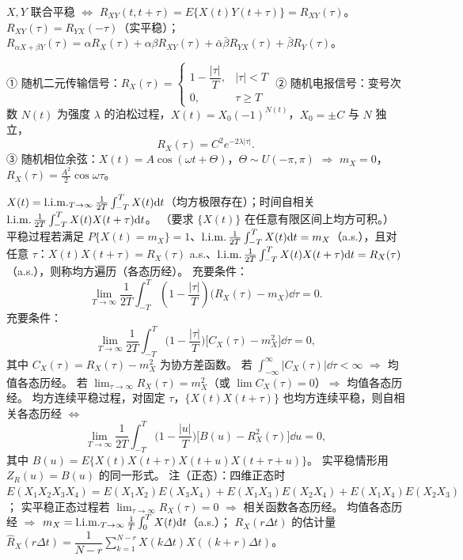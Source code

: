 \documentclass[UTF8,12pt,a4paper]{ctexart}
\begin{document}
 $X,Y$ 联合平稳 $\iff$ $R_{XY}(t,t+\tau)=E\{X(t)Y(t+\tau)\}=R_{XY}(\tau)$。
 $R_{XY}(\tau)=R_{YX}(-\tau)$（实平稳）；$R_{\alpha X+\beta Y}(\tau)=\alpha R_X(\tau)+\alpha\beta R_{XY}(\tau)+\bar\alpha\bar\beta R_{YX}(\tau)+\bar\beta R_Y(\tau)$。

① 随机二元传输信号：$R_X(\tau)=\begin{cases}1-\dfrac{|\tau|}{T},&|\tau|<T\\[2pt]0,&\tau\ge T\end{cases}$
② 随机电报信号：变号次数 $N(t)$ 为强度 $\lambda$ 的泊松过程，$X(t)=X_0(-1)^{N(t)}$，$X_0=\pm C$ 与 $N$ 独立，
$$R_X(\tau)=C^2e^{-2\lambda|\tau|}.$$
③ 随机相位余弦：$X(t)=A\cos(\omega t+\Theta)$，$\Theta\sim U(-\pi,\pi)$ $\Rightarrow$ $m_X=0$，$R_X(\tau)=\tfrac{A^2}{2}\cos\omega\tau$。

 $X(t)=\mathop{\mathrm{l.i.m.}}_{T\to\infty}\frac1{2T}\int_{-T}^{T}X(t)\mathrm{d} t$（均方极限存在）；时间自相关 $\mathop{\mathrm{l.i.m.}}\frac1{2T}\int_{-T}^{T}X(t)X(t+\tau)\mathrm{d} t$。
（要求 $\{X(t)\}$ 在任意有限区间上均方可积。）
 平稳过程若满足 $P\{X(t)=m_X\}=1$、$\mathop{\mathrm{l.i.m.}}\frac1{2T}\int_{-T}^{T}X(t)\mathrm{d} t=m_X$（a.s.），且对任意 $\tau$：$X(t)X(t+\tau)=R_X(\tau)$ a.s.、$\mathop{\mathrm{l.i.m.}}\frac1{2T}\int_{-T}^{T}X(t)X(t+\tau)\mathrm{d} t=R_X(\tau)$（a.s.），则称均方遍历（各态历经）。
 充要条件：
$$\lim_{T\to\infty}\frac1{2T}\int_{-T}^{T}\left(1-\frac{|\tau|}{T}\right)\big(R_X(\tau)-m_X\big)\dd\tau=0.$$
 充要条件：
$$\lim_{T\to\infty}\frac1{2T}\int_{-T}^{T}\Big(1-\frac{|\tau|}{T}\Big)\Big[C_X(\tau)-m_X^2\Big]\dd\tau=0,$$
其中 $C_X(\tau)=R_X(\tau)-m_X^2$ 为协方差函数。
 若 $\int_{-\infty}^{\infty}|C_X(\tau)|\dd\tau<\infty$ $\Rightarrow$ 均值各态历经。
 若 $\lim_{\tau\to\infty}R_X(\tau)=m_X^2$（或 $\lim C_X(\tau)=0$）$\Rightarrow$ 均值各态历经。
 均方连续平稳过程，对固定 $\tau$，$\{X(t)X(t+\tau)\}$ 也均方连续平稳，则自相关各态历经 $\iff$
$$\lim_{T\to\infty}\frac1{2T}\int_{-T}^{T}\Big(1-\frac{|u|}{T}\Big)\big[B(u)-R_X^2(\tau)\big]\dd u=0,$$
其中 $B(u)=E\{X(t)X(t+\tau)X(t+u)X(t+\tau+u)\}$。
 实平稳情形用 $Z_R(u)=B(u)$ 的同一形式。
注（正态）：四维正态时 $E(X_1X_2X_3X_4)=E(X_1X_2)E(X_3X_4)+E(X_1X_3)E(X_2X_4)+E(X_1X_4)E(X_2X_3)$；
实平稳正态过程若 $\lim_{\tau\to\infty}R_X(\tau)=0$ $\Rightarrow$ 相关函数各态历经。
 均值各态历经 $\Rightarrow$ $m_X=\mathop{\mathrm{l.i.m.}}_{T\to\infty}\frac1T\int_0^TX(t)\mathrm{d} t$（a.s.）；
$R_X(r\Delta t)$ 的估计量 $\hat R_X(r\Delta t)=\dfrac{1}{N-r}\sum_{k=1}^{N-r}X(k\Delta t)X((k+r)\Delta t)$。
\end{document}
